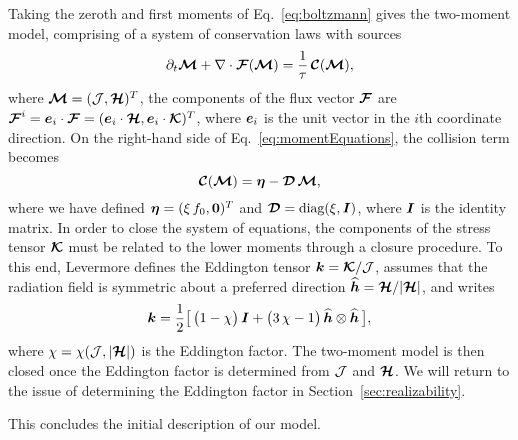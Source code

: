 Taking the zeroth and first moments of Eq.~\eqref{eq:boltzmann} gives the two-moment model, comprising of a system of conservation laws with sources
\begin{equation}
  \partial_{t}{\boldsymbol{\mathcal{M}}}+\nabla\cdot\boldsymbol{\mathcal{F}}(\boldsymbol{\mathcal{M}})=\frac{1}{\tau}\,\boldsymbol{\mathcal{C}}(\boldsymbol{\mathcal{M}}),
  \label{eq:momentEquations}
\end{equation}
where $\boldsymbol{\mathcal{M}}=(\mathcal{J},\boldsymbol{\mathcal{H}})^{T}$, the components of the flux vector $\boldsymbol{\mathcal{F}}$ are $\boldsymbol{\mathcal{F}}^{i}=\boldsymbol{e}_{i}\cdot\boldsymbol{\mathcal{F}}=(\boldsymbol{e}_{i}\cdot\boldsymbol{\mathcal{H}},\boldsymbol{e}_{i}\cdot\boldsymbol{\mathcal{K}})^{T}$, where $\boldsymbol{e}_{i}$ is the unit vector in the $i$th coordinate direction.  
On the right-hand side of Eq.~\eqref{eq:momentEquations}, the collision term becomes
\begin{equation}
  \boldsymbol{\mathcal{C}}(\boldsymbol{\mathcal{M}})=\boldsymbol{\eta}-\boldsymbol{\mathcal{D}}\,\boldsymbol{\mathcal{M}}, 
  \label{eq:collisionTermMoments}
\end{equation}
where we have defined $\boldsymbol{\eta}=(\xi\,f_{0},\boldsymbol{0})^{T}$ and $\boldsymbol{\mathcal{D}}=\mbox{diag}(\xi,\boldsymbol{I})$, where $\boldsymbol{I}$ is the identity matrix.  
In order to close the system of equations, the components of the stress tensor $\boldsymbol{\mathcal{K}}$ must be related to the lower moments through a closure procedure.  
To this end, Levermore \cite{levermore_1984} defines the Eddington tensor $\boldsymbol{k}=\boldsymbol{\mathcal{K}}/\mathcal{J}$, assumes that the radiation field is symmetric about a preferred direction $\widehat{\boldsymbol{h}}=\boldsymbol{\mathcal{H}}/|\boldsymbol{\mathcal{H}}|$, and writes
\begin{equation}
  \boldsymbol{k}=\frac{1}{2}\big[\,\big(1-\chi\big)\,\boldsymbol{I}+\big(3\,\chi-1\big)\,\widehat{\boldsymbol{h}}\otimes\widehat{\boldsymbol{h}}\,\big],
\end{equation}
where $\chi=\chi(\mathcal{J},|\boldsymbol{\mathcal{H}}|)$ is the Eddington factor.  
The two-moment model is then closed once the Eddington factor is determined from $\mathcal{J}$ and $\boldsymbol{\mathcal{H}}$.  
We will return to the issue of determining the Eddington factor in Section~\ref{sec:realizability}.  

This concludes the initial description of our model.  